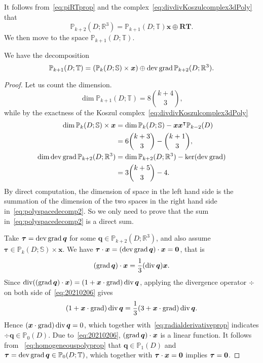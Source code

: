 It follows from~\eqref{eq:piRTprop} and the complex~\eqref{eq:divdivKoszulcomplex3dPoly} that
\[
\mathbb P_{k+2}(D; \mathbb R^3)= \mathbb P_{k+1}(D; \mathbb T)\boldsymbol x\oplus\boldsymbol{RT}.
\]
We then move to the space $\mathbb P_{k+1}(D; \mathbb T)$.
\begin{lemma}
We have the decomposition
\begin{equation}\label{eq:polyspacedecomp2}
\mathbb P_{k+1}(D; \mathbb T) = (\mathbb P_k(D; \mathbb S)\times\boldsymbol x)\oplus\operatorname{dev}\operatorname{grad}\mathbb P_{k+2}(D; \mathbb R^3).
\end{equation}
\end{lemma}
\begin{proof}
Let us count the dimension. 
$$
\dim \mathbb P_{k+1}(D; \mathbb T) = 8 { k + 4 \choose 3},
$$
while by the exactness of the Koszul complex~\eqref{eq:divdivKoszulcomplex3dPoly}
\begin{align*}
\dim \mathbb P_k(D; \mathbb S)\times\boldsymbol x &= \dim \mathbb P_k(D; \mathbb S) - \boldsymbol x\boldsymbol x^{\intercal} \mathbb P_{k-2}(D) \\
&= 6 { k + 3 \choose 3} -  { k + 1 \choose 3}, \\
\dim \operatorname{dev}\operatorname{grad}\mathbb P_{k+2}(D; \mathbb R^3) &= \dim \mathbb P_{k+2}(D; \mathbb R^3) - \ker(\operatorname{dev}\operatorname{grad})\\
& = 3 { k + 5 \choose 3} - 4. 
\end{align*} 
By direct computation, the dimension of space in the left hand side is the summation of the dimension of the two spaces in the right hand side in~\eqref{eq:polyspacedecomp2}. So we only need to prove that the sum in~\eqref{eq:polyspacedecomp2} is a direct sum.

Take $\boldsymbol\tau=\operatorname{dev}\operatorname{grad}\boldsymbol q$  for some $\boldsymbol q\in\mathbb P_{k+2}(D; \mathbb R^3)$, and also assume $\boldsymbol \tau\in\mathbb P_k(D; \mathbb S)\times\boldsymbol x$. We have $\boldsymbol\tau\cdot\boldsymbol x=(\operatorname{dev}\operatorname{grad}\boldsymbol q)\cdot\boldsymbol x=\boldsymbol 0$, that is
\begin{equation}\label{eq:20210206}
(\operatorname{grad}\boldsymbol q)\cdot\boldsymbol x=\frac{1}{3}(\operatorname{div}\boldsymbol q)\boldsymbol x.
\end{equation}
Since $\operatorname{div}((\operatorname{grad}\boldsymbol q)\cdot\boldsymbol x)=(1+\boldsymbol x\cdot\operatorname{grad})\operatorname{div}\boldsymbol q$, applying the divergence operator $\div$ on both side of~\eqref{eq:20210206} gives
$$
(1+\boldsymbol x\cdot\operatorname{grad})\operatorname{div}\boldsymbol q=\frac{1}{3}(3+\boldsymbol x\cdot\operatorname{grad})\operatorname{div}\boldsymbol q.
$$
Hence $(\boldsymbol x\cdot\operatorname{grad})\operatorname{div}\boldsymbol q=0$, which together with~\eqref{eq:radialderivativeprop} indicates $\div\boldsymbol q\in\mathbb P_{0}(D)$. Due to~\eqref{eq:20210206}, $(\operatorname{grad}\boldsymbol q)\cdot\boldsymbol x$ is a linear function. It follows from ~\eqref{eq:homogeneouspolyprop} that $\boldsymbol q\in\mathbb P_1(D)$ and  $\boldsymbol\tau=\operatorname{dev}\operatorname{grad}\boldsymbol q\in\mathbb P_{0}(D;\mathbb T)$, which together with $\boldsymbol\tau\cdot\boldsymbol x=\boldsymbol0$ implies $\boldsymbol\tau=\boldsymbol0$. %
\end{proof}

